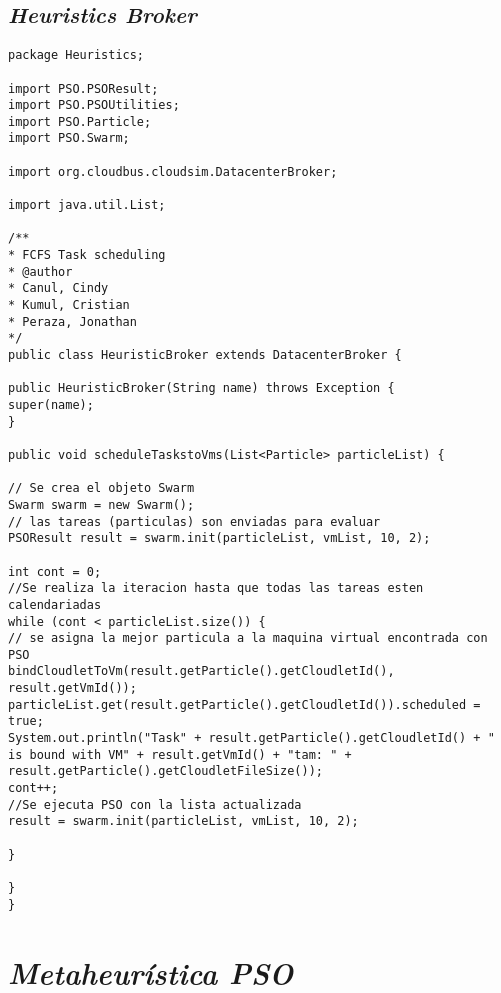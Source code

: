 \subsection*{\textit{Heuristics Broker}}
\begin{lstlisting}
package Heuristics;

import PSO.PSOResult;
import PSO.PSOUtilities;
import PSO.Particle;
import PSO.Swarm;

import org.cloudbus.cloudsim.DatacenterBroker;

import java.util.List;

/**
* FCFS Task scheduling
* @author
* Canul, Cindy
* Kumul, Cristian
* Peraza, Jonathan
*/
public class HeuristicBroker extends DatacenterBroker {

public HeuristicBroker(String name) throws Exception {
super(name);
}

public void scheduleTaskstoVms(List<Particle> particleList) {

// Se crea el objeto Swarm
Swarm swarm = new Swarm();
// las tareas (particulas) son enviadas para evaluar
PSOResult result = swarm.init(particleList, vmList, 10, 2);

int cont = 0;
//Se realiza la iteracion hasta que todas las tareas esten calendariadas
while (cont < particleList.size()) {
// se asigna la mejor particula a la maquina virtual encontrada con PSO
bindCloudletToVm(result.getParticle().getCloudletId(), result.getVmId());
particleList.get(result.getParticle().getCloudletId()).scheduled = true;
System.out.println("Task" + result.getParticle().getCloudletId() + " is bound with VM" + result.getVmId() + "tam: " + result.getParticle().getCloudletFileSize());
cont++;
//Se ejecuta PSO con la lista actualizada
result = swarm.init(particleList, vmList, 10, 2);

}

}
}

\end{lstlisting}

\newpage

\section*{\textit{Metaheurística PSO}}




